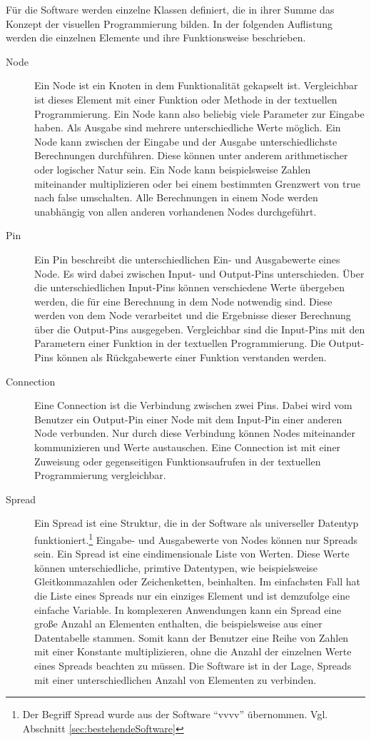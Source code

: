 \documentclass[a4paper, 
               12pt,
               DIV=calc,
               version=first,
               pdftex,
               headsepline,
               footsepline,
               bibliography=totocnumbered,
               listof=numbered]{scrreprt}
\begin{document}
Für die Software werden einzelne Klassen definiert, die in ihrer Summe das Konzept der visuellen
Programmierung bilden. In der folgenden Auflistung werden die einzelnen
Elemente und ihre Funktionsweise beschrieben.
\begin{description}
\item[Node]
Ein Node ist ein Knoten in dem Funktionalität gekapselt ist. Vergleichbar ist dieses
Element mit einer Funktion oder Methode in der textuellen Programmierung. Ein Node kann also
beliebig viele Parameter zur Eingabe haben. Als Ausgabe sind mehrere unterschiedliche Werte möglich.
Ein Node kann zwischen der Eingabe und der Ausgabe unterschiedlichste Berechnungen durchführen.
Diese können unter anderem arithmetischer oder logischer Natur sein. Ein Node kann beispielsweise
Zahlen miteinander multiplizieren oder bei einem bestimmten Grenzwert von true nach false
umschalten.
Alle Berechnungen in einem Node werden unabhängig von allen anderen vorhandenen Nodes durchgeführt.
\item[Pin]
Ein Pin beschreibt die unterschiedlichen Ein- und Ausgabewerte eines Node.
Es wird dabei zwischen Input- und Output-Pins unterschieden. Über die unterschiedlichen
Input-Pins können verschiedene Werte übergeben werden, die für eine Berechnung in dem Node notwendig sind.
Diese werden von dem Node verarbeitet und die Ergebnisse dieser Berechnung
über die Output-Pins ausgegeben.
Vergleichbar sind die Input-Pins mit den Parametern einer Funktion in der textuellen Programmierung.
Die Output-Pins können als Rückgabewerte einer Funktion verstanden werden.
\item[Connection]
Eine Connection ist die Verbindung zwischen zwei Pins. Dabei wird vom Benutzer ein Output-Pin einer
Node mit dem Input-Pin einer anderen Node verbunden. Nur durch diese Verbindung können
Nodes miteinander kommunizieren und Werte austauschen. Eine Connection
ist mit einer Zuweisung oder gegenseitigen Funktionsaufrufen in der textuellen Programmierung vergleichbar.
\item[Spread]
Ein Spread ist eine Struktur, die in der Software als universeller Datentyp funktioniert.\footnote{Der
Begriff Spread wurde aus der Software "`vvvv"' übernommen. Vgl. Abschnitt \ref{sec:bestehendeSoftware}}
Eingabe- und Ausgabewerte von Nodes können nur Spreads sein. Ein Spread ist eine 
eindimensionale Liste von Werten. Diese Werte können unterschiedliche, primtive Datentypen,
wie beispielsweise Gleitkommazahlen oder Zeichenketten, beinhalten. Im einfachsten Fall hat
die Liste eines Spreads nur ein einziges Element und ist demzufolge eine einfache Variable. In komplexeren
Anwendungen kann ein Spread eine große Anzahl an Elementen enthalten, die beispielsweise
aus einer Datentabelle stammen. Somit kann der Benutzer eine Reihe von Zahlen mit
einer Konstante multiplizieren, ohne die Anzahl der einzelnen Werte eines Spreads
beachten zu müssen. Die Software ist in der Lage, Spreads mit einer unterschiedlichen
Anzahl von Elementen zu verbinden.
\end{description}
\end{document}
